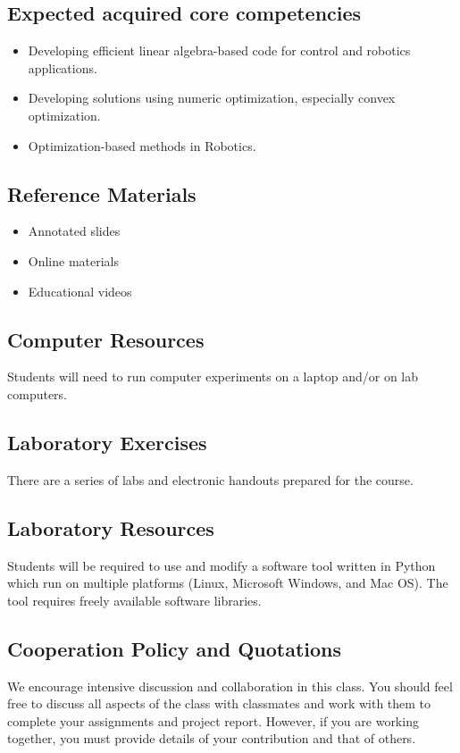 \subsection{Expected acquired core competencies}
 
\begin{itemize}
    \item Developing efficient linear algebra-based code for control and robotics applications.
    \item Developing solutions using numeric optimization, especially convex optimization.
    \item Optimization-based methods in Robotics.
\end{itemize} 

\subsection{Reference Materials}
\begin{itemize}
    \item Annotated slides
    \item Online materials
    \item Educational videos
\end{itemize}

\subsection{Computer Resources}
Students will need to run computer experiments on a laptop and/or on lab computers. 

\subsection{Laboratory Exercises} 
There are a series of labs and electronic handouts prepared for the course.

\subsection{Laboratory Resources}
Students will be required to use and modify a software tool written in Python which run on multiple platforms (Linux, Microsoft Windows, and Mac OS). The tool requires freely available software libraries.

\subsection{Cooperation Policy and Quotations}
We encourage intensive discussion and collaboration in this class. You should feel free to discuss all aspects of the class with classmates and work with them to complete your assignments and project report. However, if you are working together, you must provide details of your contribution and that of others.